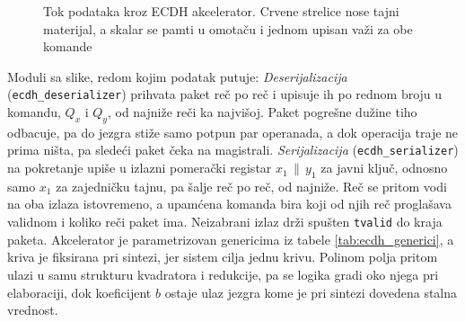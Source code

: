 \begin{figure}[H]
\centering
{}
\caption[Tok podataka kroz ECDH akcelerator]{Tok podataka kroz ECDH akcelerator. Crvene strelice nose tajni materijal, a skalar se pamti u omotaču i jednom upisan važi za obe komande}
\label{fig:ecdh_ip_tok}
\end{figure}

Moduli sa slike, redom kojim podatak putuje:
\smallbreak
\textit{Deserijalizacija} (\texttt{ecdh\_deserializer}) prihvata paket reč po reč i upisuje ih po rednom broju u komandu, $Q_x$ i $Q_y$, od najniže reči ka najvišoj. Paket pogrešne dužine tiho odbacuje, pa do jezgra stiže samo potpun par operanada, a dok operacija traje ne prima ništa, pa sledeći paket čeka na magistrali.
\smallbreak
\textit{Serijalizacija} (\texttt{ecdh\_serializer}) na pokretanje upiše u izlazni pomerački registar $x_1 \,\|\, y_1$ za javni ključ, odnosno samo $x_1$ za zajedničku tajnu, pa šalje reč po reč, od najniže. Reč se pritom vodi na oba izlaza istovremeno, a upamćena komanda bira koji od njih reč proglašava validnom i koliko reči paket ima. Neizabrani izlaz drži spušten \texttt{tvalid} do kraja paketa.
\smallbreak
Akcelerator je parametrizovan genericima iz tabele \ref{tab:ecdh_generici}, a kriva je fiksirana pri sintezi, jer sistem cilja jednu krivu. Polinom polja pritom ulazi u samu strukturu kvadratora i redukcije, pa se logika gradi oko njega pri elaboraciji, dok koeficijent $b$ ostaje ulaz jezgra kome je pri sintezi dovedena stalna vrednost.

